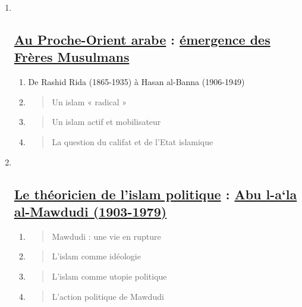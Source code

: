 \begin{enumerate}
\def\labelenumi{\Roman{enumi}.}
\item ~
  \hypertarget{au-proche-orient-arabe-uxe9mergence-des-fruxe8res-musulmans}{%
  \subsection{\texorpdfstring{\underline{Au Proche-Orient arabe} :
  \underline{émergence des Frères
  Musulmans}}{Au Proche-Orient arabe : émergence des Frères Musulmans}}\label{au-proche-orient-arabe-uxe9mergence-des-fruxe8res-musulmans}}

  \begin{enumerate}
  \def\labelenumii{\arabic{enumii}.}
  \item
    De Rashid Rida (1865-1935) à Hasan al-Banna (1906-1949)
  \item
    \begin{quote}
    Un islam « radical »
    \end{quote}
  \item
    \begin{quote}
    Un islam actif et mobilisateur
    \end{quote}
  \item
    \begin{quote}
    La question du califat et de l'Etat islamique
    \end{quote}
  \end{enumerate}
\item ~
  \hypertarget{le-thuxe9oricien-de-lislam-politique-abu-l-ala-al-mawdudi-1903-1979}{%
  \subsection{\texorpdfstring{\underline{Le théoricien de l'islam
  politique} : \underline{Abu l-a`la al-Mawdudi
  (1903-1979)}}{Le théoricien de l'islam politique : Abu l-a`la al-Mawdudi (1903-1979)}}\label{le-thuxe9oricien-de-lislam-politique-abu-l-ala-al-mawdudi-1903-1979}}

  \begin{enumerate}
  \def\labelenumii{\arabic{enumii}.}
  \item
    \begin{quote}
    Mawdudi : une vie en rupture
    \end{quote}
  \item
    \begin{quote}
    L'islam comme idéologie
    \end{quote}
  \item
    \begin{quote}
    L'islam comme utopie politique
    \end{quote}
  \item
    \begin{quote}
    L'action politique de Mawdudi
    \end{quote}
  \end{enumerate}
\end{enumerate}

